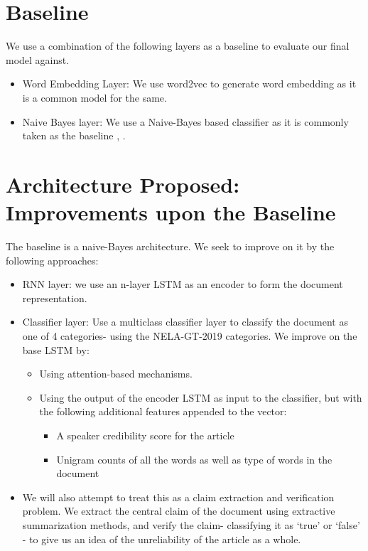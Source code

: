 \documentclass[14pt]{extarticle}
\begin{document}
\begin{multicols}{2}
\section{Baseline}
We use a combination of the following layers as a baseline to evaluate our final model against.
\begin{itemize}
\item Word Embedding Layer: We use word2vec to generate word embedding as it is a common model for the same.
\item Naive Bayes layer: We use a Naive-Bayes based classifier as it is commonly taken as the baseline \cite{c}, \cite{d}.
\end{itemize}
\section{Architecture Proposed: Improvements upon the Baseline}
The baseline is a naive-Bayes architecture. We seek to improve on it by the following approaches:
\begin{itemize}
\item RNN layer: we use an n-layer LSTM as an encoder to form the document representation.
\item Classifier layer: Use a multiclass classifier layer to classify the document as one of 4 categories- using the NELA-GT-2019 categories. We improve on the base LSTM by:
\begin{itemize}
\item Using attention-based mechanisms.
\item Using the output of the encoder LSTM as input to the classifier, but with the following additional features appended to the vector:
\begin{itemize}
\item A speaker credibility score for the article
\item Unigram counts of all the words as well as type of words in the document
\end{itemize}
\end{itemize}
\item We will also attempt to treat this as a claim extraction and verification problem. We extract the central claim of the document using extractive summarization methods, and verify the claim- classifying it as ‘true’ or ‘false’ - to give us an idea of the unreliability of the article as a whole.
\end{itemize}

\end{multicols}
\end{document}
